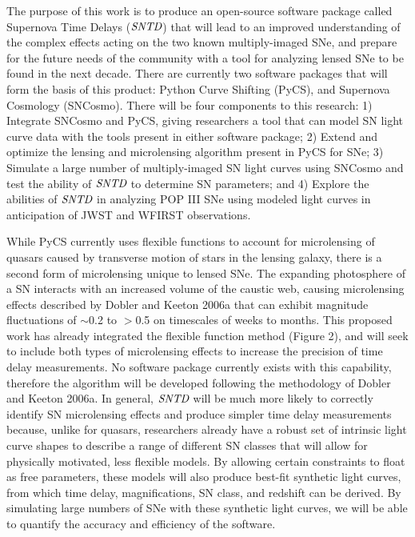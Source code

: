 The purpose of this work is to produce an open-source software
package called Supernova Time Delays ($\textit{SNTD}$) that will
lead to an improved understanding of the complex effects acting on the two known multiply-imaged SNe, and prepare for the future needs of the community with a tool for analyzing lensed SNe to be found in the next decade. There are currently two software packages
that will form the basis of this product: Python Curve Shifting (PyCS), and
Supernova Cosmology (SNCosmo). There will be four components to this
research: 1) Integrate SNCosmo and PyCS, giving researchers a tool
that can model SN light curve data with the tools present in either
software package; 2) Extend and optimize the lensing and microlensing
algorithm present in PyCS for SNe; 3) Simulate a large number of multiply-imaged SN
light curves using SNCosmo and test the ability of $\textit{SNTD}$ to
determine SN parameters; and 4) Explore the abilities of
$\textit{SNTD}$ in analyzing POP III SNe using modeled light curves in
anticipation of JWST and WFIRST observations.



While PyCS currently uses flexible functions to account for
microlensing of quasars caused by transverse motion of stars in the
lensing galaxy, there is a second form of microlensing unique to
lensed SNe. The expanding photosphere of a SN interacts with
an increased volume of the caustic web, causing microlensing effects 
described by Dobler and Keeton 2006a that can exhibit magnitude fluctuations of $\sim$0.2
to $>$0.5 on timescales of weeks to months. This proposed work has
already integrated the flexible function method (Figure 2), and will
seek to include both types of microlensing effects to increase the
precision of time delay measurements. No software package currently
exists with this capability, therefore the algorithm will be developed
following the methodology of Dobler and Keeton 2006a. In general,
$\textit{SNTD}$ will be much more likely to correctly identify SN
microlensing effects and produce simpler time delay measurements
because, unlike for quasars, researchers already have a robust set of
intrinsic light curve shapes to describe a range of different SN
classes that will allow for physically motivated, less flexible
models. By allowing certain constraints to float as free parameters,
these models will also produce best-fit synthetic light curves, from
which time delay, magnifications, SN class, and redshift can be
derived. By simulating large numbers of SNe with these synthetic light
curves, we will be able to quantify the accuracy and efficiency of the
software.


